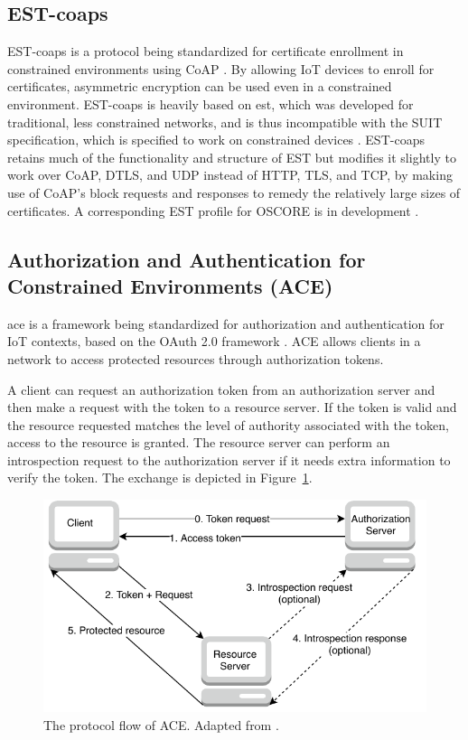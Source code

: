 \documentclass[0-thesis.tex]{subfiles}
\begin{document}
\subsection{EST-coaps}
\label{ssec:est-coaps}
EST-coaps is a protocol being standardized for certificate enrollment in constrained
environments using CoAP \parencite{est-coaps}. By allowing IoT devices to enroll for
certificates, asymmetric encryption can be used even in a constrained environment.
EST-coaps is heavily based on \gls{est}, which was developed for traditional, less
constrained networks, and is thus incompatible with the SUIT specification, which is
specified to work on constrained devices \parencite{rfc7030}. EST-coaps retains much of
the functionality and structure of EST but modifies it slightly to work over CoAP, DTLS,
and UDP instead of HTTP, TLS, and TCP, by making use of CoAP's block requests and
responses to remedy the relatively large sizes of certificates. A corresponding EST
profile for OSCORE is in development \parencite{est-oscore}.

\subsection{Authorization and Authentication for Constrained Environments (ACE)}
\label{ssec:ace}
\gls{ace} is a framework being standardized for authorization and authentication for IoT
contexts, based on the OAuth 2.0 framework \parencite{ace}. ACE allows clients in a
network to access protected resources through authorization tokens. 

A client can request an authorization token from an authorization server and then make a
request with the token to a resource server. If the token is valid and the resource
requested matches the level of authority associated with the token, access to the resource
is granted. The resource server can perform an introspection request to the authorization
server if it needs extra information to verify the token. The exchange is depicted in
Figure~\ref{fig:ace-flow}.

\begin{figure}
    \caption[The protocol flow of ACE.]
        {The protocol flow of ACE. Adapted from \parencite{ace}.}
    \label{fig:ace-flow}
    \includegraphics{images/ace.pdf}
\end{figure}
\end{document}
